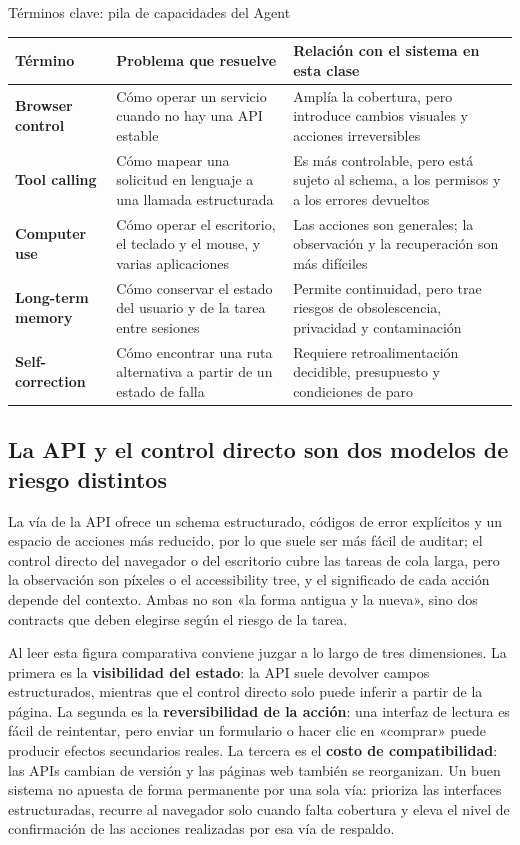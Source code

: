 \begin{knowledgebox}{Términos clave: pila de capacidades del Agent}
\begin{tabularx}{\textwidth}{>{\bfseries}p{} X X}
Término & Problema que resuelve & Relación con el sistema en esta clase \\
\hline
Browser control & Cómo operar un servicio cuando no hay una API estable & Amplía la cobertura, pero introduce cambios visuales y acciones irreversibles \\
Tool calling & Cómo mapear una solicitud en lenguaje a una llamada estructurada & Es más controlable, pero está sujeto al schema, a los permisos y a los errores devueltos \\
Computer use & Cómo operar el escritorio, el teclado y el mouse, y varias aplicaciones & Las acciones son generales; la observación y la recuperación son más difíciles \\
Long-term memory & Cómo conservar el estado del usuario y de la tarea entre sesiones & Permite continuidad, pero trae riesgos de obsolescencia, privacidad y contaminación \\
Self-correction & Cómo encontrar una ruta alternativa a partir de un estado de falla & Requiere retroalimentación decidible, presupuesto y condiciones de paro \\
\end{tabularx}
\end{knowledgebox}

\subsection{La API y el control directo son dos modelos de riesgo distintos}

La vía de la API ofrece un schema estructurado, códigos de error explícitos y un espacio de acciones más reducido, por lo que suele ser más fácil de auditar; el control directo del navegador o del escritorio cubre las tareas de cola larga, pero la observación son píxeles o el accessibility tree, y el significado de cada acción depende del contexto. Ambas no son «la forma antigua y la nueva», sino dos contracts que deben elegirse según el riesgo de la tarea.

Al leer esta figura comparativa conviene juzgar a lo largo de tres dimensiones. La primera es la \textbf{visibilidad del estado}: la API suele devolver campos estructurados, mientras que el control directo solo puede inferir a partir de la página. La segunda es la \textbf{reversibilidad de la acción}: una interfaz de lectura es fácil de reintentar, pero enviar un formulario o hacer clic en «comprar» puede producir efectos secundarios reales. La tercera es el \textbf{costo de compatibilidad}: las APIs cambian de versión y las páginas web también se reorganizan. Un buen sistema no apuesta de forma permanente por una sola vía: prioriza las interfaces estructuradas, recurre al navegador solo cuando falta cobertura y eleva el nivel de confirmación de las acciones realizadas por esa vía de respaldo.

